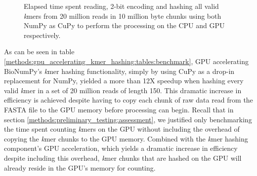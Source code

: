 \begin{figure}[H]
\centering
{}
\caption{
  Elapsed time spent reading, 2-bit encoding and hashing all valid \textit{k}mers from 20 million reads in 10 million byte chunks using both NumPy as CuPy to perform the processing on the CPU and GPU respectively.
}
\label{methods:gpu_accelerating_kmer_hashing:figures:benchmark}
\end{figure}

As can be seen in table \ref{methods:gpu_accelerating_kmer_hashing:tables:benchmark}, GPU accelerating BioNumPy's \textit{k}mer hashing functionality, simply by using CuPy as a drop-in replacement for NumPy, yielded a more than 12X speedup when hashing every valid \textit{k}mer in a set of 20 million reads of length 150.
This dramatic increase in efficiency is achieved despite having to copy each chunk of raw data read from the FASTA file to the GPU memory before processing can begin.
Recall that in section \ref{methods:preliminary_testing:assessment}, we justified only benchmarking the time spent counting \textit{k}mers on the GPU without including the overhead of copying the \textit{k}mer chunks to the GPU memory.
Combined with the \textit{k}mer hashing component's GPU acceleration, which yields a dramatic increase in efficiency despite including this overhead, \textit{k}mer chunks that are hashed on the GPU will already reside in the GPU's memory for counting.
